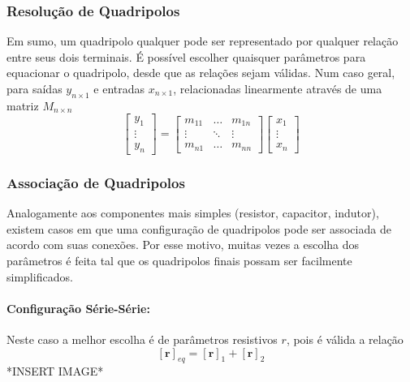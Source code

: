 \documentclass{article}
\numberwithin{equation}{section}
\begin{document}
    \subsubsection{Resolução de Quadripolos}
    \label{subsubsec:quadripolosgenerico}
    Em sumo, um quadripolo qualquer pode ser representado por qualquer relação entre seus dois terminais. É possível escolher quaisquer parâmetros para equacionar o quadripolo, desde que as relações sejam válidas. Num caso geral, para saídas $y_{n\times1}$ e entradas $x_{n\times1}$, relacionadas linearmente através de uma matriz $M_{n\times n}$
    \begin{equation*}
        \begin{bmatrix}
            y_{1} \\
            \vdots\\
            y_{n}
        \end{bmatrix}
        = %
        \begin{bmatrix}
            m_{11} & \dots & m_{1n}\\
            \vdots & \ddots& \vdots\\
            m_{n1} & \dots & m_{nn}
        \end{bmatrix}
        \begin{bmatrix}
            x_{1} \\
            \vdots\\
            x_{n}
        \end{bmatrix}
    \end{equation*}

    \subsubsection{Associação de Quadripolos}
    \label{subsubsec:quadripolosassociacao}
    Analogamente aos componentes mais simples (resistor, capacitor, indutor), existem casos em que uma configuração de quadripolos pode ser associada de acordo com suas conexões. Por esse motivo, muitas vezes a escolha dos parâmetros é feita tal que os quadripolos finais possam ser facilmente simplificados.
    \paragraph{Configuração Série-Série:}
    Neste caso a melhor escolha é de parâmetros resistivos $r$, pois é válida a relação
        $$ [\textbf{r}]_{eq} = [\textbf{r}]_{1} + [\textbf{r}]_{2} $$
        *INSERT IMAGE*
\end{document}
